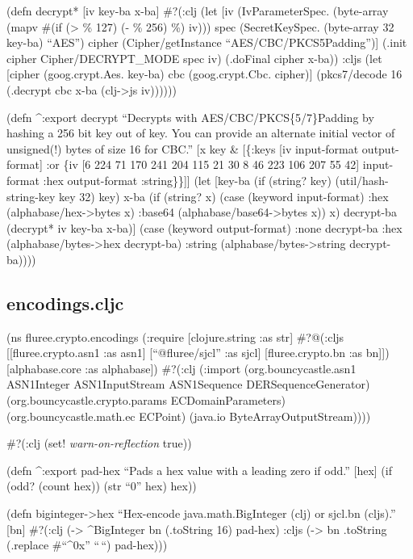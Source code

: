 \documentclass[
]{article}
\begin{document}
(defn decrypt* {[}iv key-ba x-ba{]} \#?(:clj (let {[}iv
(IvParameterSpec. (byte-array (mapv \#(if (\textgreater{} \% 127) (- \%
256) \%) iv))) spec (SecretKeySpec. (byte-array 32 key-ba) ``AES'')
cipher (Cipher/getInstance ``AES/CBC/PKCS5Padding''){]} (.init cipher
Cipher/DECRYPT\_MODE spec iv) (.doFinal cipher x-ba)) :cljs (let
{[}cipher (goog.crypt.Aes. key-ba) cbc (goog.crypt.Cbc. cipher){]}
(pkcs7/decode 16 (.decrypt cbc x-ba (clj-\textgreater js iv))))))

(defn \^{}:export decrypt ``Decrypts with AES/CBC/PKCS\{5/7\}Padding by
hashing a 256 bit key out of key. You can provide an alternate initial
vector of unsigned(!) bytes of size 16 for CBC.'' {[}x key \& {[}\{:keys
{[}iv input-format output-format{]} :or \{iv {[}6 224 71 170 241 204 115
21 30 8 46 223 106 207 55 42{]} input-format :hex output-format
:string\}\}{]}{]} (let {[}key-ba (if (string? key) (util/hash-string-key
key 32) key) x-ba (if (string? x) (case (keyword input-format) :hex
(alphabase/hex-\textgreater bytes x) :base64
(alphabase/base64-\textgreater bytes x)) x) decrypt-ba (decrypt* iv
key-ba x-ba){]} (case (keyword output-format) :none decrypt-ba :hex
(alphabase/bytes-\textgreater hex decrypt-ba) :string
(alphabase/bytes-\textgreater string decrypt-ba))))

\subsection{encodings.cljc}\label{encodings.cljc}

(ns fluree.crypto.encodings (:require {[}clojure.string :as str{]}
\#?@(:cljs {[}{[}fluree.crypto.asn1 :as asn1{]} {[}``@fluree/sjcl'' :as
sjcl{]} {[}fluree.crypto.bn :as bn{]}{]}) {[}alphabase.core :as
alphabase{]}) \#?(:clj (:import (org.bouncycastle.asn1 ASN1Integer
ASN1InputStream ASN1Sequence DERSequenceGenerator)
(org.bouncycastle.crypto.params ECDomainParameters)
(org.bouncycastle.math.ec ECPoint) (java.io ByteArrayOutputStream))))

\#?(:clj (set! \emph{warn-on-reflection} true))

(defn \^{}:export pad-hex ``Pads a hex value with a leading zero if
odd.'' {[}hex{]} (if (odd? (count hex)) (str ``0'' hex) hex))

(defn biginteger-\textgreater hex ``Hex-encode java.math.BigInteger
(clj) or sjcl.bn (cljs).'' {[}bn{]} \#?(:clj (-\textgreater{}
\^{}BigInteger bn (.toString 16) pad-hex) :cljs (-\textgreater{} bn
.toString (.replace \#``\^{}0x'' ``\,``) pad-hex)))
\end{document}
